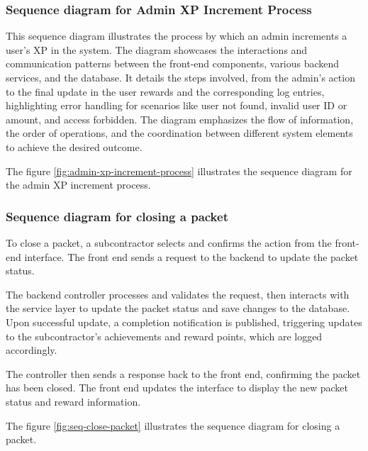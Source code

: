 \subsubsection{Sequence diagram for Admin XP Increment Process}

This sequence diagram illustrates the process by which an admin increments a user's XP in the system. The diagram showcases the interactions and communication patterns between the front-end components, various backend services, and the database. It details the steps involved, from the admin's action to the final update in the user rewards and the corresponding log entries, highlighting error handling for scenarios like user not found, invalid user ID or amount, and access forbidden. The diagram emphasizes the flow of information, the order of operations, and the coordination between different system elements to achieve the desired outcome.

\noindent The figure \ref{fig:admin-xp-increment-process} illustrates the sequence diagram for the admin XP increment process.

\subsubsection{Sequence diagram for closing a packet}

To close a packet, a subcontractor selects and confirms the action from the front-end interface. The front end sends a request to the backend to update the packet status.

The backend controller processes and validates the request, then interacts with the service layer to update the packet status and save changes to the database. Upon successful update, a completion notification is published, triggering updates to the subcontractor's achievements and reward points, which are logged accordingly.

The controller then sends a response back to the front end, confirming the packet has been closed. The front end updates the interface to display the new packet status and reward information.

\noindent The figure \ref{fig:seq-close-packet} illustrates the sequence diagram for closing a packet.

